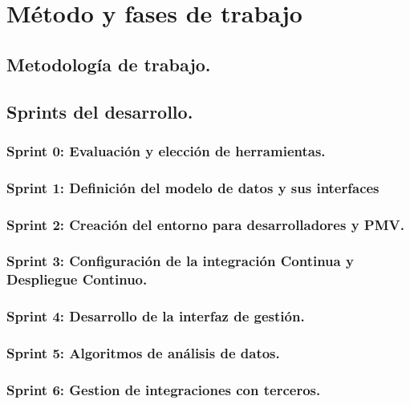 \chapter{Método y fases de trabajo}

\section{Metodología de trabajo.}
\section{Sprints del desarrollo.}
\subsection{Sprint 0: Evaluación y elección de herramientas.}
\subsection{Sprint 1: Definición del modelo de datos y sus interfaces}
\subsection{Sprint 2: Creación del entorno para desarrolladores y PMV.}
\subsection{Sprint 3: Configuración de la integración Continua y Despliegue
  Continuo.}
\subsection{Sprint 4: Desarrollo de la interfaz de gestión.}
\subsection{Sprint 5: Algoritmos de análisis de datos.}
\subsection{Sprint 6: Gestion de integraciones con terceros.}